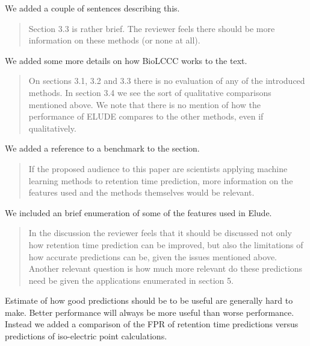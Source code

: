 \documentclass[letterpaper]{article}
\newcommand{\breview}{\begin{quotation}\begin{bf}\noindent}
\newcommand{\ereview}{\end{bf}\end{quotation}}
\begin{document}
We added a couple of sentences describing this.
\breview

Section 3.3 is rather brief. The reviewer feels there should be more information on these methods (or none at all).
\ereview

We added some more details on how BioLCCC works to the text.

\breview


On sections 3.1, 3.2 and 3.3 there is no evaluation of any of the
introduced methods. In section 3.4 we see the sort of qualitative
comparisons mentioned above. We note that there is no mention of how
the performance of ELUDE compares to the other methods, even if
qualitatively.

\ereview
We added a reference to a benchmark to the section.
\breview

If the proposed audience to this paper are scientists applying machine
learning methods to retention time prediction, more information on the
features used and the methods themselves would be relevant. 

\ereview

We included an brief enumeration of some of the features used in Elude.

\breview

In the discussion the reviewer feels that it should be discussed not
only how retention time prediction can be improved, but also the
limitations of how accurate predictions can be, given the issues
mentioned above. Another relevant question is how much more relevant
do these predictions need be given the applications enumerated in
section 5.

\ereview

Estimate of how good predictions should be to be useful are generally
hard to make. Better performance will always be more useful than worse
performance.  Instead we added a comparison of the FPR of retention
time predictions versus predictions of iso-electric point calculations.
\end{document}
